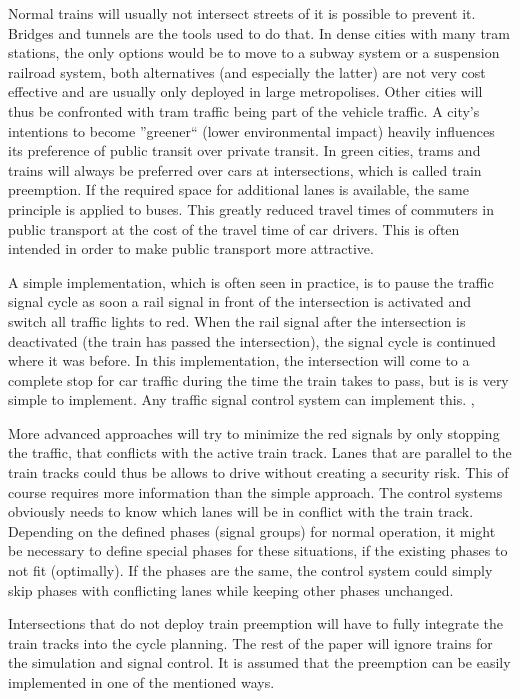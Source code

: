 Normal trains will usually not intersect streets of it is possible to prevent it. Bridges and tunnels are the tools used to do that. In dense cities with many tram stations, the only options would be to move to a subway system or a suspension railroad system, both alternatives (and especially the latter) are not very cost effective and are usually only deployed in large metropolises. Other cities will thus be confronted with tram traffic being part of the vehicle traffic. A city's intentions to become ''greener`` (lower environmental impact) heavily influences its preference of public transit over private transit. In green cities, trams and trains will always be preferred over cars at intersections, which is called train preemption. If the required space for additional lanes is available, the same principle is applied to buses. This greatly reduced travel times of commuters in public transport at the cost of the travel time of car drivers. This is often intended in order to make public transport more attractive.

A simple implementation, which is often seen in practice, is to pause the traffic signal cycle as soon a rail signal in front of the intersection is activated and switch all traffic lights to red. When the rail signal after the intersection is deactivated (the train has passed the intersection), the signal cycle is continued where it was before. In this implementation, the intersection will come to a complete stop for car traffic during the time the train takes to pass, but is is very simple to implement. Any traffic signal control system can implement this. \cite{mutcd}, \cite{ptsnrc}

More advanced approaches will try to minimize the red signals by only stopping the traffic, that conflicts with the active train track. Lanes that are parallel to the train tracks could thus be allows to drive without creating a security risk. This of course requires more information than the simple approach. The control systems obviously needs to know which lanes will be in conflict with the train track. Depending on the defined phases (signal groups) for normal operation, it might be necessary to define special phases for these situations, if the existing phases to not fit (optimally). If the phases are the same, the control system could simply skip phases with conflicting lanes while keeping other phases unchanged.

Intersections that do not deploy train preemption will have to fully integrate the train tracks into the cycle planning. The rest of the paper will ignore trains for the simulation and signal control. It is assumed that the preemption can be easily implemented in one of the mentioned ways.
